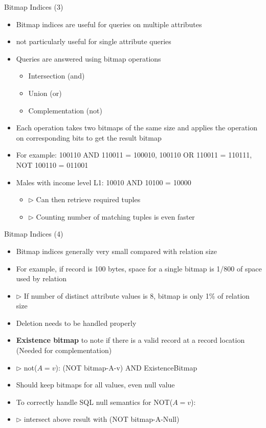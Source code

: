 \documentclass[aspectratio=169, xcolor=dvipsnames]{beamer}
\begin{document}
\begin{frame}{Bitmap Indices (3)}
    \begin{itemize}[<+->]
        \item Bitmap indices are useful for queries on multiple attributes
        \item not particularly useful for single attribute queries
        \item Queries are answered using bitmap operations
        \begin{itemize}[<+->]
            \item Intersection (and)
            \item Union (or)
            \item Complementation (not)
        \end{itemize}
        \item Each operation takes two bitmaps of the same size and applies the operation on corresponding bits to get the result bitmap
        \item For example: 100110 AND 110011 = 100010, 100110 OR 110011 = 110111, NOT 100110 = 011001
        \item Males with income level L1: 10010 AND 10100 = 10000
        \begin{itemize}[<+->]
            \item $\triangleright$ Can then retrieve required tuples
            \item $\triangleright$ Counting number of matching tuples is even faster
        \end{itemize}
    \end{itemize}
\end{frame}

\begin{frame}{Bitmap Indices (4)}
    \begin{itemize}[<+->]
        \item Bitmap indices generally very small compared with relation size
        \item For example, if record is 100 bytes, space for a single bitmap is 1/800 of space used by relation
        \item $\triangleright$ If number of distinct attribute values is 8, bitmap is only 1\% of relation size
        \item Deletion needs to be handled properly
        \item \textbf{Existence bitmap} to note if there is a valid record at a record location (Needed for complementation)
        \item $\triangleright$ not($A=v$): (NOT bitmap-A-v) AND ExistenceBitmap
        \item Should keep bitmaps for all values, even null value
        \item To correctly handle SQL null semantics for NOT($A=v$):
        \item $\triangleright$ intersect above result with (NOT bitmap-A-Null)
    \end{itemize}
\end{frame}
\end{document}
